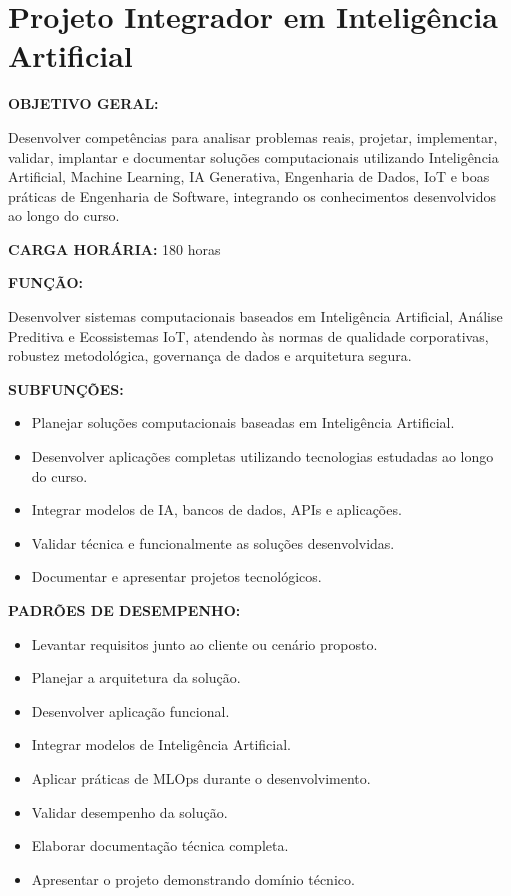 \section{Projeto Integrador em Inteligência Artificial}

\textbf{OBJETIVO GERAL:}

Desenvolver competências para analisar problemas reais, projetar, implementar, validar, implantar e documentar soluções computacionais utilizando Inteligência Artificial, Machine Learning, IA Generativa, Engenharia de Dados, IoT e boas práticas de Engenharia de Software, integrando os conhecimentos desenvolvidos ao longo do curso.

\textbf{CARGA HORÁRIA:} 180 horas

\textbf{FUNÇÃO:}

Desenvolver sistemas computacionais baseados em Inteligência Artificial, Análise Preditiva e Ecossistemas IoT, atendendo às normas de qualidade corporativas, robustez metodológica, governança de dados e arquitetura segura.

\textbf{SUBFUNÇÕES:}

\begin{itemize}
\item Planejar soluções computacionais baseadas em Inteligência Artificial.
\item Desenvolver aplicações completas utilizando tecnologias estudadas ao longo do curso.
\item Integrar modelos de IA, bancos de dados, APIs e aplicações.
\item Validar técnica e funcionalmente as soluções desenvolvidas.
\item Documentar e apresentar projetos tecnológicos.
\end{itemize}

\textbf{PADRÕES DE DESEMPENHO:}

\begin{itemize}
\item Levantar requisitos junto ao cliente ou cenário proposto.
\item Planejar a arquitetura da solução.
\item Desenvolver aplicação funcional.
\item Integrar modelos de Inteligência Artificial.
\item Aplicar práticas de MLOps durante o desenvolvimento.
\item Validar desempenho da solução.
\item Elaborar documentação técnica completa.
\item Apresentar o projeto demonstrando domínio técnico.
\end{itemize}

